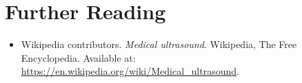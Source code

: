 \section{Further Reading}
\begin{itemize}
  \item Wikipedia contributors. \textit{Medical ultrasound}. Wikipedia, The Free Encyclopedia. Available at: \url{https://en.wikipedia.org/wiki/Medical_ultrasound}.
\end{itemize}

